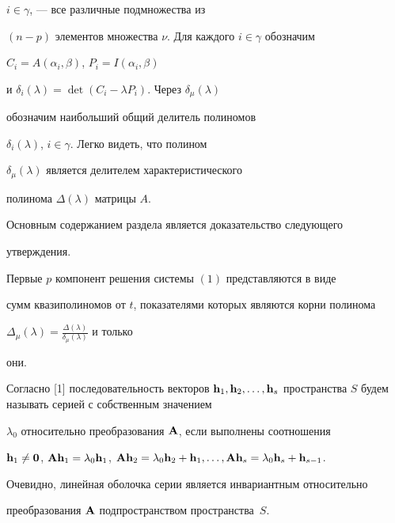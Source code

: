 $i\in\gamma$, --- все различные подмножества из 


$(n-p)$ элементов множества $\nu$. Для каждого $i\in\gamma$ обозначим 


$C_i=A(\alpha_i,\beta)$, $P_i=I(\alpha_i,\beta)$ 


и $\delta_i(\lambda)=\det(C_i-\lambda P_i)$. Через $\delta_\mu(\lambda)$ 


обозначим наибольший общий делитель полиномов 


$\delta_i(\lambda)$, $i\in\gamma$. Легко видеть, что полином 


$\delta_\mu(\lambda)$ является делителем характеристического 


полинома $\Delta(\lambda)$ матрицы $A$. 


 


Основным содержанием раздела является доказательство следующего 


утверждения. 


 


\begin{thm} 


Первые $p$ компонент решения системы $(1)$ представляются в виде 


сумм квазиполиномов от $t$, показателями которых являются корни полинома 


$\Delta_\mu(\lambda)=\frac{\Delta(\lambda)}{\delta_\mu(\lambda)}$ и только 


они. 


\end{thm} 


 


Согласно [1] последовательность векторов $\bold h_1,\bold h_2,\dotsc,\bold 


h_s$ пространства $S$ будем называть серией с собственным значением 


$\lambda_0$ относительно преобразования $\bold A$, если выполнены соотношения 


$\bold h_1\ne\bold 0$, $\bold A\bold h_1=\lambda_0\bold h_1$, $\bold A\bold 


h_2=\lambda_0\bold h_2+\bold h_1,\dotsc,\bold A\bold h_s=\lambda_0\bold 


h_s+\bold h_{s-1}$. 


Очевидно, линейная оболочка серии является инвариантным относительно 


преобразования $\bold A$ подпространством пространства~$S$. 


